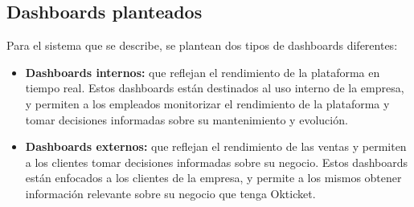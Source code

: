 \subsection{Dashboards planteados}
Para el sistema que se describe, se plantean dos tipos de dashboards diferentes:

\begin{itemize}
	\item \textbf{Dashboards internos:} que reflejan el rendimiento de la
		plataforma en tiempo real. Estos dashboards están destinados al uso
		interno de la empresa, y permiten a los empleados monitorizar el
		rendimiento de la plataforma y tomar decisiones informadas sobre su
		mantenimiento y evolución.
	\item \textbf{Dashboards externos:} que reflejan el rendimiento de las
		ventas y permiten a los clientes tomar decisiones informadas sobre su
		negocio. Estos dashboards están enfocados a los clientes de la empresa,
		y permite a los mismos obtener información relevante sobre su negocio
		que tenga Okticket.
\end{itemize}
